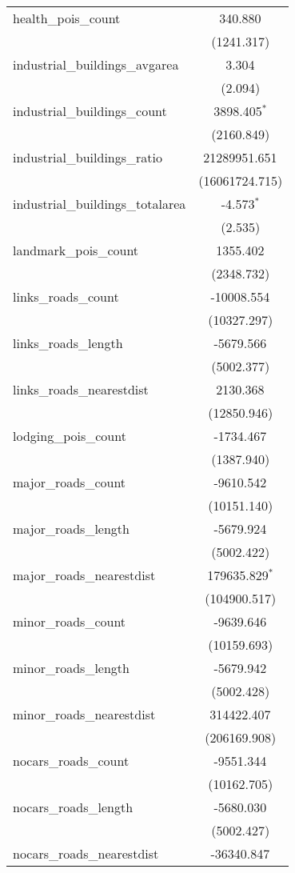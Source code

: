 \begin{table}[!htbp]
\begin{tabular}{@{\extracolsep{5pt}}lc}
 health_pois_count & 340.880$^{}$ \\
  & (1241.317) \\
 industrial_buildings_avgarea & 3.304$^{}$ \\
  & (2.094) \\
 industrial_buildings_count & 3898.405$^{*}$ \\
  & (2160.849) \\
 industrial_buildings_ratio & 21289951.651$^{}$ \\
  & (16061724.715) \\
 industrial_buildings_totalarea & -4.573$^{*}$ \\
  & (2.535) \\
 landmark_pois_count & 1355.402$^{}$ \\
  & (2348.732) \\
 links_roads_count & -10008.554$^{}$ \\
  & (10327.297) \\
 links_roads_length & -5679.566$^{}$ \\
  & (5002.377) \\
 links_roads_nearestdist & 2130.368$^{}$ \\
  & (12850.946) \\
 lodging_pois_count & -1734.467$^{}$ \\
  & (1387.940) \\
 major_roads_count & -9610.542$^{}$ \\
  & (10151.140) \\
 major_roads_length & -5679.924$^{}$ \\
  & (5002.422) \\
 major_roads_nearestdist & 179635.829$^{*}$ \\
  & (104900.517) \\
 minor_roads_count & -9639.646$^{}$ \\
  & (10159.693) \\
 minor_roads_length & -5679.942$^{}$ \\
  & (5002.428) \\
 minor_roads_nearestdist & 314422.407$^{}$ \\
  & (206169.908) \\
 nocars_roads_count & -9551.344$^{}$ \\
  & (10162.705) \\
 nocars_roads_length & -5680.030$^{}$ \\
  & (5002.427) \\
 nocars_roads_nearestdist & -36340.847$^{}$ \\

\end{tabular}
\end{table}
